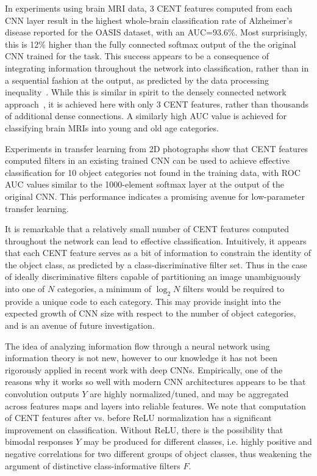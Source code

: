 \documentclass[10pt,onecolumn]{article}
\begin{document}
In experiments using brain MRI data, 3 CENT features computed from each CNN layer result in the highest whole-brain classification rate of Alzheimer's disease reported for the OASIS dataset, with an AUC=93.6\%. Most surprisingly, this is 12\% higher than the fully connected softmax output of the the original CNN trained for the task. This success appears to be a consequence of integrating information throughout the network into classification, rather than in a sequential fashion at the output, as predicted by the data processing inequality~\cite{cover2012elements}. While this is similar in spirit to the densely connected network approach~\cite{huang2016densely}, it is achieved here with only 3 CENT features, rather than thousands of additional dense connections. A similarly high AUC value is achieved for classifying brain MRIs into young and old age categories. 

Experiments in transfer learning from 2D photographs show that CENT features computed filters in an existing trained CNN can be used to achieve effective classification for 10 object categories not found in the training data, with ROC AUC values similar to the 1000-element softmax layer at the output of the original CNN. This performance indicates a promising avenue for low-parameter transfer learning.

It is remarkable that a relatively small number of CENT features computed throughout the network can lead to effective classification. Intuitively, it appears that each CENT feature serves as a bit of information to constrain the identity of the object class, as predicted by a class-discriminative filter set. Thus in the case of ideally discriminative filters capable of partitioning an image unambiguously into one of $N$ categories, a minimum of $\log_2 N$ filters would be required to provide a unique code to each category. This may provide insight into the expected growth of CNN size with respect to the number of object categories, and is an avenue of future investigation.

The idea of analyzing information flow through a neural network using information theory is not new, however to our knowledge it has not been rigorously applied in recent work with deep CNNs. Empirically, one of the reasons why it works so well with modern CNN architectures appears to be that convolution outputs $Y$ are highly normalized/tuned, and may be aggregated across features maps and layers into reliable features. We note that computation of CENT features after vs. before ReLU normalization has a significant improvement on classification. Without ReLU, there is the possibility that bimodal responses $Y$ may be produced for different classes, i.e. highly positive and negative correlations for two different groups of object classes, thus weakening the argument of distinctive class-informative filters $F$.
\end{document}
